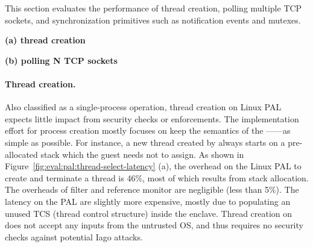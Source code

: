 \label{sec:eval:pal:sched}

This section evaluates the performance of thread creation,
polling multiple TCP sockets,
and synchronization primitives such as notification events and mutexes. 


\begin{figure*}[t!]
\centering
\footnotesize
{}
\parbox{0.49\textwidth}{\centering\bf (a) thread creation}
\parbox{0.49\textwidth}{\centering\bf (b) polling N TCP sockets}
\caption{(a) Thread creation latency and (b) latency of polling a number of TCP sockets.
Lower is better.
The comparison is between (1)  and  on Linux; (2)  and  on the Linux PAL, with and without a \seccomp{} filter ({\bf +SC}) and reference monitor ({\bf +RM}); (3) the same \hostapis{} on the \sgx{} PAL.}
\label{fig:eval:pal:thread-select-latency}
\end{figure*}


\paragraph{Thread creation.}
Also classified as a single-process operation,
thread creation on Linux PAL
expects little impact from security checks or enforcements.
The implementation effort
for process creation mostly focuses on keep the semantics of the \hostapi{}------as simple as possible.
For instance, a new thread created by  always starts
on a pre-allocated stack
which the guest needs not to assign.
As shown in
Figure~\ref{fig:eval:pal:thread-select-latency} (a),
the overhead
on the Linux PAL
to create and terminate a thread
is \roughly{}46\%,
most of which results from stack allocation.
The overheads of \seccomp{} filter and reference monitor are negligible (less than 5\%).
The latency on the \sgx{} PAL
are slightly more expensive, mostly due to
populating an unused TCS (thread control structure) inside the enclave.
Thread creation on \sgx{} does not accept any inputs
from the untrusted OS,
and thus requires no security checks
against potential Iago attacks.





